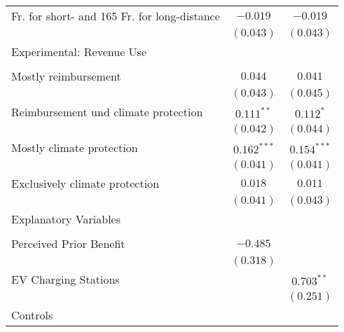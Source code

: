 \begin{center}
\begin{tiny}
\begin{longtable}{l@{} c@{} c@{}}
\quad 55 Fr. for short- and 165 Fr. for long-distance    & $-0.019$         & $-0.019$         \\
                                                         & $(0.043)$        & $(0.043)$        \\
Experimental: Revenue Use                                &                  &                  \\
                                                         &                  &                  \\
\quad Mostly reimbursement                               & $0.044$          & $0.041$          \\
                                                         & $(0.043)$        & $(0.045)$        \\
\quad Reimbursement und climate protection               & $0.111^{**}$     & $0.112^{*}$      \\
                                                         & $(0.042)$        & $(0.044)$        \\
\quad Mostly climate protection                          & $0.162^{***}$    & $0.154^{***}$    \\
                                                         & $(0.041)$        & $(0.041)$        \\
\quad Exclusively climate protection                     & $0.018$          & $0.011$          \\
                                                         & $(0.041)$        & $(0.043)$        \\
Explanatory Variables                                    &                  &                  \\
                                                         &                  &                  \\
\quad Perceived Prior Benefit                            & $-0.485$         &                  \\
                                                         & $(0.318)$        &                  \\
\quad EV Charging Stations                               &                  & $0.703^{**}$     \\
                                                         &                  & $(0.251)$        \\
Controls                                                 &                  &                  \\

\end{longtable}
\end{tiny}
\end{center}
